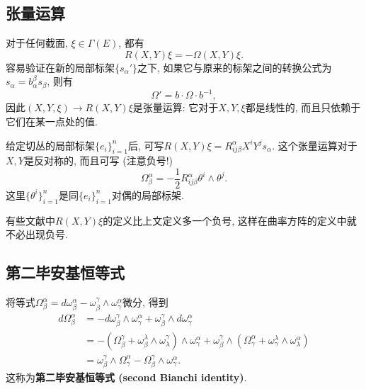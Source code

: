 \subsection{张量运算}
对于任何截面, $\xi\in\Gamma(E)$, 都有
$$
R(X,Y)\xi=-\Omega(X,Y)\xi.
$$
容易验证在新的局部标架$\{s_\alpha'\}$之下, 如果它与原来的标架之间的转换公式为$s_\alpha=b_\alpha^\beta s_\beta$, 则有
$$
\Omega'=b\cdot\Omega \cdot b^{-1},
$$
因此$(X,Y,\xi)\to R(X,Y)\xi$是张量运算: 它对于$X,Y,\xi$都是线性的, 而且只依赖于它们在某一点处的值. 

给定切丛的局部标架$\{e_i\}_{i=1}^n$后, 可写$R(X,Y)\xi=R^\alpha_{ij\beta}X^iY^js_\alpha$. 这个张量运算对于$X,Y$是反对称的, 而且可写 (注意负号!)
$$
\Omega_\beta^\alpha=-\frac{1}{2}R^\alpha_{ij\beta}\theta^i\wedge\theta^j.
$$
这里$\{\theta^i\}_{i=1}^n$是同$\{e_i\}_{i=1}^n$对偶的局部标架.

有些文献中$R(X,Y)\xi$的定义比上文定义多一个负号, 这样在曲率方阵的定义中就不必出现负号.

\subsection{第二毕安基恒等式}
将等式$\Omega_\beta^\alpha=d\omega_\beta^\alpha-\omega_\beta^\gamma\wedge\omega_\gamma^\alpha$微分, 得到
$$
\begin{aligned}
d\Omega_\beta^\alpha&=-d\omega_\beta^\gamma\wedge\omega_\gamma^\alpha+\omega_\beta^\gamma\wedge d\omega_\gamma^\alpha\\
&=-(\Omega_\beta^\gamma+\omega_\beta^\lambda\wedge\omega_\lambda^\gamma)\wedge\omega_\gamma^\alpha
+\omega_\beta^\gamma\wedge(\Omega_\gamma^\alpha+\omega_\gamma^\lambda\wedge\omega_\lambda^\alpha)\\
&=\omega_\beta^\gamma\wedge\Omega_\gamma^\alpha-\Omega_\beta^\gamma\wedge\omega_\gamma^\alpha.
\end{aligned}
$$
这称为\textbf{第二毕安基恒等式 (second Bianchi identity)}.